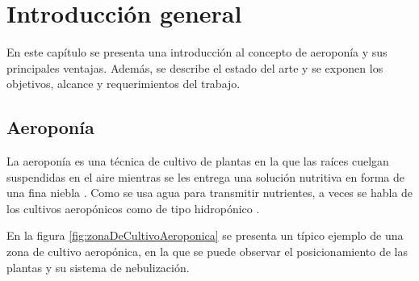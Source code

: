 
\chapter{Introducción general} %

\label{Chapter1} %
\label{IntroGeneral}


\newcommand{\keyword}[1]{\textbf{#1}}
\newcommand{\tabhead}[1]{\textbf{#1}}
\newcommand{\code}[1]{\texttt{#1}}
\newcommand{\file}[1]{\texttt{\bfseries#1}}
\newcommand{\option}[1]{\texttt{\itshape#1}}
\newcommand{\grados}{$^{\circ}$}



En este capítulo se presenta una introducción al concepto de aeroponía y sus principales ventajas. Además, se describe el estado del arte y se exponen los objetivos, alcance y requerimientos del trabajo.


\section{Aeroponía}

La aeroponía es una técnica de cultivo de plantas en la que las raíces cuelgan suspendidas en el aire mientras se les entrega una solución nutritiva en forma de una fina niebla \citep{WEBSITE:AEROPONIA1}. Como se usa agua para transmitir nutrientes, a veces se habla de los cultivos aeropónicos como de tipo hidropónico \citep{WEBSITE:HIDROPONIA}.

En la figura \ref{fig:zonaDeCultivoAeroponica} se presenta un típico ejemplo de una zona de cultivo aeropónica, en la que se puede observar el posicionamiento de las plantas y su sistema de nebulización.

